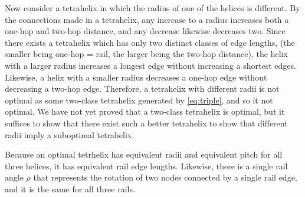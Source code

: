 \documentclass[review]{siamonline1116}
\begin{document}
Now consider a tetrahelix in which the radius of one of the helices is different.
By the connections made in a tetrahelix, any increase to a radius increases both
a one-hop and two-hop distance, and any decrease likewise decreases two.
Since there exists a tetrahelix which has only two distinct classes of edge lengths,
(the smaller being one-hop = rail, the larger being the two-hop distance), the helix
with a larger radius increases a longest edge without increasing a shortest edges.
Likewise, a helix with a smaller radius decreases a one-hop edge without decreasing
a two-hop edge.  Therefore, a tetrahelix with different radii is not optimal as some two-class 
tetrahelix generated by \cref{eq:triple}, and so it not optimal. We have not yet
proved that a two-class tetrahelix is optimal, but it suffices to show that there
exist such a better tetrahelix to show that different radii imply a suboptimal
tetrahelix.

Because an optimal tetrhelix has equivalent radii and equivalent pitch for all three helices,
it has equivalent rail edge lengths. Likewise, there is a single rail angle $\rho$ that
represents the rotation of two nodes connected by a single rail edge, and it is the same
for all three rails.






\end{document}
